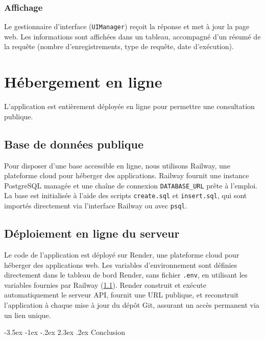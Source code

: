 \documentclass[a4paper,12pt]{report}
\makeatletter
\def\chapter{\@startsection {chapter}{0}{\z@}
                                   {-3.5ex \@plus -1ex \@minus -.2ex}
                                   {2.3ex \@plus.2ex}
                                   {\normalfont\huge\bfseries}}
\makeatother
\begin{document}
\subsubsection{Affichage}
Le gestionnaire d’interface (\texttt{UIManager}) reçoit la réponse et met à jour la page web. Les informations sont affichées dans un tableau, accompagné d’un résumé de la requête (nombre d’enregistrements, type de requête, date d’exécution).


\section{Hébergement en ligne}
\label{subsec:hebergement}

L’application est entièrement déployée en ligne pour permettre une consultation publique.

\subsection{Base de données publique}
\label{subsubsec:railway}

Pour disposer d’une base accessible en ligne, nous utilisons Railway, une plateforme cloud pour héberger des applications. Railway fournit une instance PostgreSQL managée et une chaîne de connexion \texttt{DATABASE\_URL} prête à l’emploi. La base est initialisée à l’aide des scripts \texttt{create.sql} et \texttt{insert.sql}, qui sont importés directement via l’interface Railway ou avec \texttt{psql}.

\subsection{Déploiement en ligne du serveur}
\label{subsubsec:render}

Le code de l’application est déployé sur Render, une plateforme cloud pour héberger des applications web. Les variables d’environnement sont définies directement dans le tableau de bord Render, sans fichier \texttt{.env}, en utilisant les variables fournies par Railway (\ref{subsubsec:railway}). Render construit et exécute automatiquement le serveur API, fournit une URL publique, et reconstruit l’application à chaque mise à jour du dépôt Git, assurant un accès permanent via un lien unique.




\chapter{Conclusion}
\end{document}
